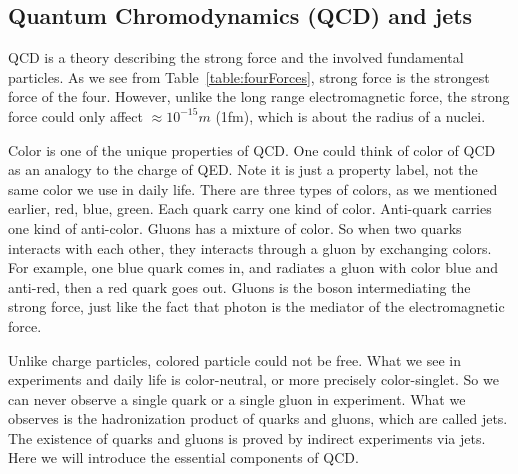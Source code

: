 



 



\subsection{Quantum Chromodynamics (QCD) and jets}

QCD is a theory describing the strong force and the involved fundamental particles. 
As we see from Table~\ref{table:fourForces}, strong force is the strongest force of the four. 
However, unlike the long range electromagnetic force, 
the strong force could only affect ${\approx} 10^{-15}m$ (1fm), which is about the radius of 
a nuclei. 

Color is one of the unique properties of QCD. One could think of color of QCD as an analogy to the charge of QED. Note it is just a property label, not the same color we use in daily life. 
There are three types of colors, as we mentioned earlier, red,
blue, green. Each quark carry one kind of color. 
Anti-quark carries one kind of anti-color.  Gluons has a mixture of color. 
So when two quarks interacts with each other, 
they interacts through a gluon by exchanging colors.
For example, one blue quark comes in, and radiates a gluon with color blue and anti-red, 
then a red quark goes out.  
Gluons is the boson intermediating the strong force, just like the fact that
photon is the mediator of the electromagnetic force.

Unlike charge particles, colored particle could not be free. What we see in experiments and daily life is 
color-neutral, or more precisely color-singlet. So we can never observe a single quark or a single gluon 
in experiment. What we observes is the hadronization product of quarks and gluons, which are
called jets. The existence of quarks and gluons is proved by indirect experiments via jets. 
Here we will introduce the essential components of QCD. 

